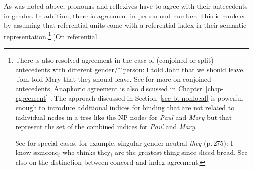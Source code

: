 \documentclass[output=paper,biblatex,babelshorthands,newtxmath,draftmode,colorlinks,citecolor=brown]{langscibook}
\begin{document}
As was noted above,  pronouns and reflexives have to agree with their antecedents in
gender.
In addition, there is agreement in person and number. This is modeled by assuming that
referential units come with a referential index in their semantic representation.\footnote{
 There is also resolved agreement in the case of (conjoined or split) antecedents with different
 gender/""person:
\eal
\ex I told John that we should leave.
\ex Tom told Mary that they should leave. \citep[]{Bresnan82c}
\zl
See 
for more on conjoined antecedents. Anaphoric agreement is also discussed in Chapter~\ref{chap-agreement}
\citep[Section~\ref{agreement:sec-anaphotic-agreement}]{chapters/agreement}. The approach discussed in
Section~\ref{sec-bt-nonlocal} is powerful enough to 
introduce additional indices for binding that are not related to individual nodes in a tree like the
NP nodes for \emph{Paul} and \emph{Mary} but that represent the set of the combined indices for \emph{Paul} and
\emph{Mary}.

See  for special cases, for example, singular
    gender-neutral \emph{they} (p.\,275):
\ea
I know someone$_i$ who thinks they$_i$ are the greatest thing since sliced bread.
\z
See also  on the distinction between concord and index agreement.
} (On referential
\end{document}
